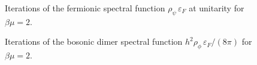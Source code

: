 \begin{figure}[t]
	\centering
	\caption[Fermion spectral functions close to the critical temperature]{Iterations of the fermionic spectral function $\rho_{\psi}\,\varepsilon_F$ at unitarity for $\beta\mu=2$.}
	\label{fig:fermion-specs-critical}
\end{figure}
%
\begin{figure}[t]
	\centering
	\caption[Boson spectral functions close to the critical temperature]{Iterations of the bosonic dimer spectral function $h^2\rho_{\phi}\,\varepsilon_F/(8\pi)$ for $\beta\mu=2$.}
	\label{fig:boson-specs-critical}
\end{figure}

